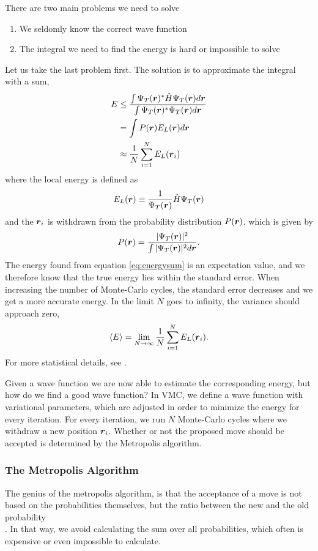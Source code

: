 There are two main problems we need to solve
\begin{enumerate}
	\item We seldomly know the correct wave function
	\item The integral we need to find the energy is hard or impossible to solve
\end{enumerate}
Let us take the last problem first. The solution is to approximate the integral with a sum,
\begin{align}
E &\leq \frac{\int\Psi_T(\boldsymbol{{r}})^*\hat{H}\Psi_T(\boldsymbol{{r}}) d\boldsymbol{{r}}}{\int\Psi_T(\boldsymbol{{r}})^*\Psi_T(\boldsymbol{{r}}) d\boldsymbol{{r}}} \notag\\
& = \int P(\boldsymbol{{r}}) E_L(\boldsymbol{{r}}) d\boldsymbol{{r}} \notag\\
& \approx \frac{1}{N}\sum_{i=1}^NE_L(\boldsymbol{{r}}_i) \label{eq:energysum}
\end{align}
where the local energy is defined as
\begin{equation}
E_L(\boldsymbol{{r}})\equiv\frac{1}{\Psi_T(\boldsymbol{{r}})}\hat{H}\Psi_T(\boldsymbol{{r}})
\label{eq:local energy}
\end{equation}
and the $\boldsymbol{{r}}_i$ is withdrawn from the probability distribution $P(\boldsymbol{{r}})$, which is given by
\begin{equation}
P(\boldsymbol{{r}})=\frac{|\Psi_T(\boldsymbol{{r}})|^2}{\int|\Psi_T(\boldsymbol{{r}})|^2d\boldsymbol{{r}}}.
\end{equation}
The energy found from equation \eqref{eq:energysum} is an expectation value, and we therefore know that the true energy lies within the standard error. When increasing the number of Monte-Carlo cycles, the standard error decreases and we get a more accurate energy. In the limit $N$ goes to infinity, the variance should approach zero,
\begin{equation}
\langle E\rangle=\lim_{N\to\infty} \frac{1}{N}\sum_{i=1}^NE_L(\boldsymbol{{r}}_i).
\end{equation}
For more statistical details, see \cite{deb_variational_2014}. 

Given a wave function we are now able to estimate the corresponding energy, but how do we find a good wave function? In VMC, we define a wave function with variational parameters, which are adjusted in order to minimize the energy for every iteration. For every iteration, we run $N$ Monte-Carlo cycles where we withdraw a new position $\boldsymbol{{r}}_i$. Whether or not the proposed move should be accepted is determined by the Metropolis algorithm.

\subsubsection{The Metropolis Algorithm}
The genius of the metropolis algorithm, is that the acceptance of a move is not based on the probabilities themselves, but the ratio between the new and the old probability\\
. In that way, we avoid calculating the sum over all probabilities, which often is expensive or even impossible to calculate. 

